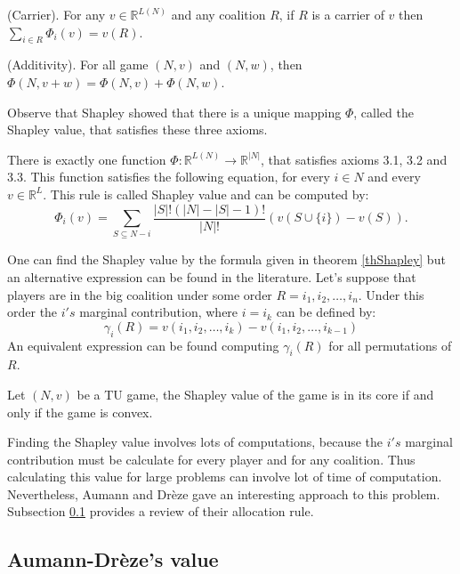 \begin{axiom}
	(Carrier). For any $ v \in \mathbb{R}^{L(N)}$ and any coalition $R$, if $R$ is a carrier of $v$ then $\sum_{i \in R}\Phi_{i}(v)= v(R)$.
\end{axiom}


\begin{axiom}
	(Additivity). For all game $(N,v) $ and $(N,w)$, then $\Phi(N, v+w) = \Phi(N, v) + \Phi(N, w) $.
\end{axiom}

Observe that Shapley showed that there is a unique mapping $\Phi$, called the Shapley value, that satisfies these three axioms.

\begin{theorem}
	\label{thShapley}
	There is exactly one function $\Phi: \mathbb{R}^{L(N)} \rightarrow \mathbb{R}^{|N|}$, that satisfies axioms 3.1, 3.2 and 3.3. This function satisfies the following equation, for every $i \in N$ and every $v \in \mathbb{R}^{L}$. This rule is called Shapley value and can be computed by:
	$$ \Phi_{i}(v) = \sum_{S \subseteq N - i }\frac{|S|!(|N|-|S|-1)!}{|N|!} (v(S \cup \{i\}) - v(S)).$$ 
\end{theorem}

One can find the Shapley value by the formula given in theorem \ref{thShapley} but an alternative expression can be found in the literature. Let's suppose that players are in the big coalition under some order $R = i_1,i_2, \dots, i_n$. Under this order the $i's$ marginal contribution, where $i = i_k$ can be defined by:
$$\gamma_i(R) = v(i_1,i_2, \dots, i_k) - v(i_1,i_2, \dots, i_{k-1})$$
An equivalent expression can be found computing $\gamma_i(R)$ for all permutations of $R$.
\begin{theorem}\label{ShapleyConvexo}
	Let $(N,v)$ be a TU game, the Shapley value of the game is in its core if and only if the game is convex. 
\end{theorem}

Finding the Shapley value involves lots of computations, because the $i's$ marginal contribution must be calculate for every player and for any coalition. Thus calculating this value for large problems can involve lot of time of computation. Nevertheless, Aumann and Dr\`eze gave an interesting approach to this problem. Subsection \ref{subAumann} provides a review of their allocation rule.

\subsection{Aumann-Dr\`eze's value}\label{subAumann}

